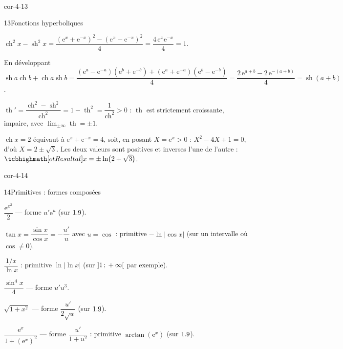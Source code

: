 \begin{blocLivre}{cor-4-13}
\begin{corrige}{13}{Fonctions hyperboliques}
\begin{questions}
  \item $\operatorname{ch}^{2}x-\operatorname{sh}^{2}x
    =\dfrac{(\mathrm{e}^{x}+\mathrm{e}^{-x})^{2}-(\mathrm{e}^{x}-\mathrm{e}^{-x})^{2}}{4}
    =\dfrac{4\,\mathrm{e}^{x}\mathrm{e}^{-x}}{4}=1$.
  \item En développant
    $\operatorname{sh}a\operatorname{ch}b+\operatorname{ch}a\operatorname{sh}b
    =\dfrac{(\mathrm{e}^{a}-\mathrm{e}^{-a})(\mathrm{e}^{b}+\mathrm{e}^{-b})
    +(\mathrm{e}^{a}+\mathrm{e}^{-a})(\mathrm{e}^{b}-\mathrm{e}^{-b})}{4}
    =\dfrac{2\,\mathrm{e}^{a+b}-2\,\mathrm{e}^{-(a+b)}}{4}=\operatorname{sh}(a+b)$.
  \item $\operatorname{th}'=\dfrac{\operatorname{ch}^{2}-\operatorname{sh}^{2}}{\operatorname{ch}^{2}}
    =1-\operatorname{th}^{2}=\dfrac{1}{\operatorname{ch}^{2}}>0$ :
    $\operatorname{th}$ est strictement croissante, impaire, avec
    $\lim_{\pm\infty}\operatorname{th}=\pm1$.
  \item $\operatorname{ch}x=2$ équivaut à $\mathrm{e}^{x}+\mathrm{e}^{-x}=4$, soit, en
    posant $X=\mathrm{e}^{x}>0$ : $X^{2}-4X+1=0$, d'où $X=2\pm\sqrt3$. Les deux
    valeurs sont positives et inverses l'une de l'autre :
    $\res{x=\pm\ln\bigl(2+\sqrt3\bigr)}$.
\end{questions}
\end{corrige}
\end{blocLivre}

\begin{blocLivre}{cor-4-14}
\begin{corrige}{14}{Primitives : formes composées}
\begin{questions}
  \item $\dfrac{\mathrm{e}^{x^{2}}}{2}$ — forme $u'\mathrm{e}^{u}$ (sur $1.9$).
  \item $\tan x=\dfrac{\sin x}{\cos x}=-\dfrac{u'}{u}$ avec $u=\cos$ :
    primitive $-\ln|\cos x|$ (sur un intervalle où $\cos\neq0$).
  \item $\dfrac{1/x}{\ln x}$ : primitive $\ln|\ln x|$ (sur $\mathopen{]}1\,{;}\,+\infty\mathclose{[}$
    par exemple).
  \item $\dfrac{\sin^{4}x}{4}$ — forme $u'u^{3}$.
  \item $\sqrt{1+x^{2}}$ — forme $\dfrac{u'}{2\sqrt{u}}$ (sur $1.9$).
  \item $\dfrac{\mathrm{e}^{x}}{1+(\mathrm{e}^{x})^{2}}$ — forme $\dfrac{u'}{1+u^{2}}$ :
    primitive $\arctan(\mathrm{e}^{x})$ (sur $1.9$).
\end{questions}
\end{corrige}
\end{blocLivre}

